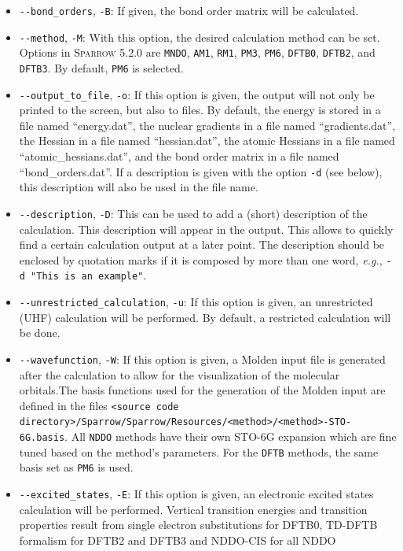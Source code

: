 \documentclass[]{tufte-book}
\begin{document}
\begin{itemize}
\item \texttt{-{}-bond\_orders}, \texttt{-B}: If given, the bond order matrix will be calculated.
\item \texttt{-{}-method}, \texttt{-M}: With this option, the desired calculation method can be set. Options in
\textsc{Sparrow} 5.2.0 are \texttt{MNDO}, \texttt{AM1}, \texttt{RM1}, \texttt{PM3}, \texttt{PM6}, \texttt{DFTB0}, \texttt{DFTB2}, and
\texttt{DFTB3}. By default, \texttt{PM6} is selected.
\item \texttt{-{}-output\_to\_file}, \texttt{-o}: If this option is given, the output will not only be printed to the screen, 
but also to files. By default, the energy is stored in a file named ``energy.dat'', the nuclear gradients in a file named
``gradients.dat'', the Hessian in a file named ``hessian.dat'', the atomic Hessians in a file named ``atomic\_hessians.dat'', and the
bond order matrix in a file named ``bond\_orders.dat''.
If a description is given with the option \texttt{-d} (see below), this description will also be used in the file name.
\item \texttt{-{}-description}, \texttt{-D}: This can be used to add a (short) description of the calculation. This
description will appear in the output. This allows to quickly find a certain calculation output at a later point. The
description should be enclosed by quotation marks if it is composed by more than one word, \textit{e.g.},
\texttt{-d "This is an example"}.
\item \texttt{-{}-unrestricted\_calculation}, \texttt{-u}: If this option is given, an unrestricted (UHF) calculation
will be performed. By default, a restricted calculation will be done.
\item \texttt{-{}-wavefunction}, \texttt{-W}: If this option is given, a Molden input file is generated after the
calculation to allow for the visualization of the molecular orbitals.The basis functions used for the generation of the
Molden input are defined in the files \texttt{<source code directory>/Sparrow/Sparrow/Resources/<method>/<method>-STO-6G.basis}.
All \texttt{NDDO} methods have their own STO-6G expansion which are fine tuned based on the method's parameters.
For the \texttt{DFTB} methods, the same basis set as \texttt{PM6} is used.
\item \texttt{-{}-excited\_states}, \texttt{-E}: If this option is given, an
  electronic excited states calculation will be performed. Vertical transition
    energies and transition properties result from single electron substitutions
    for DFTB0, TD-DFTB formalism for DFTB2 and DFTB3 and NDDO-CIS for all NDDO

\end{itemize}
\end{document}
